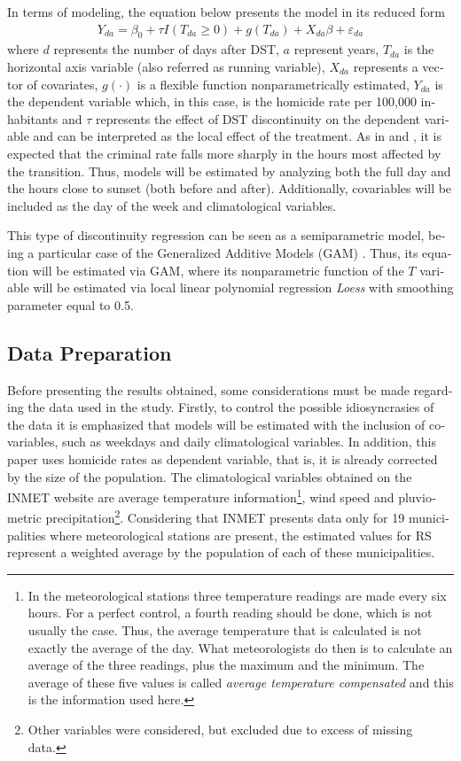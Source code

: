 \documentclass[12pt,openright,oneside,a4paper,english,french,spanish]{abntex2}
\numberwithin{table}{section} %
\numberwithin{figure}{section} %
\newcommand{\co}{\citeonline}
\begin{document}
\begin{otherlanguage}{english}
In terms of modeling, the equation below presents the model in its reduced form
\begin{align*}
Y_{da}=\beta_{0} + \tau I(T_{da}\geq 0)+g(T_{da})+X_{da}\beta + \varepsilon_{da}
\label{eq:mod_rdd}
\end{align*}
where $d$ represents the number of days after DST, $a$ represent years, $T_{da}$ is the horizontal axis variable (also referred as running variable), $X_{da}$ represents a vector of covariates, $g(\cdot)$ is a flexible function nonparametrically estimated, $Y_{da}$ is the dependent variable which, in this case, is the homicide rate per 100,000 inhabitants and $\tau$ represents the effect of DST discontinuity on the dependent variable and can be interpreted as the local effect of the treatment. As in \co{doleac2015} and \co{toro2016}, it is expected that the criminal rate falls more sharply in the hours most affected by the transition. Thus, models will be estimated by analyzing both the full day and the hours close to sunset (both before and after). Additionally, covariables will be included as the day of the week and climatological variables.

This type of discontinuity regression can be seen as a semiparametric model, being a particular case of the Generalized Additive Models (GAM) \cite{loeffler2015processed}. Thus, its equation will be estimated via GAM, where its nonparametric function of the $T$ variable will be estimated via local linear polynomial regression \textit{Loess} \cite{cleveland1988locally} with smoothing parameter equal to 0.5.

\subsection{Data Preparation\label{preparacao_dados_HV}}

Before presenting the results obtained, some considerations must be made regarding the data used in the study. Firstly, to control the possible idiosyncrasies of the data it is emphasized that models will be estimated with the inclusion of covariables, such as weekdays and daily climatological variables. In addition, this paper uses homicide rates as dependent variable, that is, it is already corrected by the size of the population. The climatological variables obtained on the INMET website are average temperature information\footnote{In the meteorological stations three temperature readings are made every six hours. For a perfect control, a fourth reading should be done, which is not usually the case. Thus, the average temperature that is calculated is not exactly the average of the day. What meteorologists do then is to calculate an average of the three readings, plus the maximum and the minimum. The average of these five values is called \textit{average temperature compensated} and this is the information used here.}, wind speed and pluviometric precipitation\footnote{Other variables were considered, but excluded due to excess of missing data.}. Considering that INMET presents data only for 19 municipalities where meteorological stations are present, the estimated values for RS represent a weighted average by the population of each of these municipalities.


\end{otherlanguage}
\end{document}

